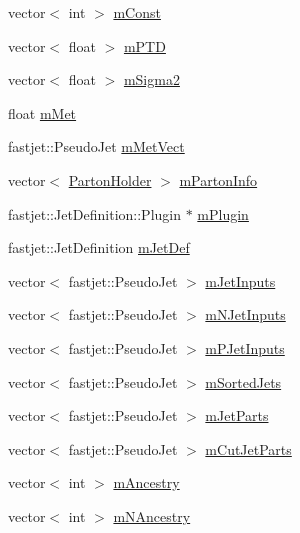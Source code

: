 \begin{DoxyCompactItemize}
vector$<$ int $>$ \hyperlink{class_herwig_1_1_herwig_tree_a98e0a308cd96f540d32c4f4f21744a97}{m\+Const}
\item 
vector$<$ float $>$ \hyperlink{class_herwig_1_1_herwig_tree_a7b7332a3ca42994d5f044a8edeadeeb2}{m\+P\+TD}
\item 
vector$<$ float $>$ \hyperlink{class_herwig_1_1_herwig_tree_ae4570b94630f03dedd19fd68494b6a71}{m\+Sigma2}
\item 
float \hyperlink{class_herwig_1_1_herwig_tree_a24471be817f37cd3f4f9eb2b984c9260}{m\+Met}
\item 
fastjet\+::\+Pseudo\+Jet \hyperlink{class_herwig_1_1_herwig_tree_a49d3c642cc2d55ee2d96dd063ad8f0ed}{m\+Met\+Vect}
\item 
vector$<$ \hyperlink{struct_parton_holder}{Parton\+Holder} $>$ \hyperlink{class_herwig_1_1_herwig_tree_aea4b92ced12093c2e65c97bfe3a0a839}{m\+Parton\+Info}
\item 
fastjet\+::\+Jet\+Definition\+::\+Plugin $\ast$ \hyperlink{class_herwig_1_1_herwig_tree_a0ca52a2a08bedfe7c516f3efd133d489}{m\+Plugin}
\item 
fastjet\+::\+Jet\+Definition \hyperlink{class_herwig_1_1_herwig_tree_ae80b94db0009e26c4b5fbbc0d14d31b3}{m\+Jet\+Def}
\item 
vector$<$ fastjet\+::\+Pseudo\+Jet $>$ \hyperlink{class_herwig_1_1_herwig_tree_a22ebbb6eef9ef80f746f683008abb301}{m\+Jet\+Inputs}
\item 
vector$<$ fastjet\+::\+Pseudo\+Jet $>$ \hyperlink{class_herwig_1_1_herwig_tree_a217545505d0f79dc889d212ee8f82516}{m\+N\+Jet\+Inputs}
\item 
vector$<$ fastjet\+::\+Pseudo\+Jet $>$ \hyperlink{class_herwig_1_1_herwig_tree_a595863c9ae182137ddaab450045c50a6}{m\+P\+Jet\+Inputs}
\item 
vector$<$ fastjet\+::\+Pseudo\+Jet $>$ \hyperlink{class_herwig_1_1_herwig_tree_a2d63c5091aefdf707d992bd80830e76b}{m\+Sorted\+Jets}
\item 
vector$<$ fastjet\+::\+Pseudo\+Jet $>$ \hyperlink{class_herwig_1_1_herwig_tree_a19bee8df38df5b5fffd77dd75d4ae956}{m\+Jet\+Parts}
\item 
vector$<$ fastjet\+::\+Pseudo\+Jet $>$ \hyperlink{class_herwig_1_1_herwig_tree_a33c5453b6426268754d1f0c36bd62ef1}{m\+Cut\+Jet\+Parts}
\item 
vector$<$ int $>$ \hyperlink{class_herwig_1_1_herwig_tree_a36b5a22cf3dac0687b42e4ee1650aab5}{m\+Ancestry}
\item 
vector$<$ int $>$ \hyperlink{class_herwig_1_1_herwig_tree_aee9127c2468fe19ec48667cd8f3de2a2}{m\+N\+Ancestry}

\end{DoxyCompactItemize}
